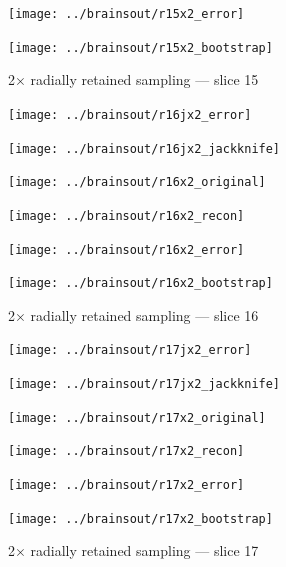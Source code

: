 \documentclass[article]{jdssv}
\begin{document}
\begin{appendix}
\begin{figure}
\begin{centering}
\parbox{\imsize}{\texttt{[image: ../brainsout/r15x2\_error]}}
\parbox{\imsize}{\texttt{[image: ../brainsout/r15x2\_bootstrap]}}

\end{centering}
\caption{2$\times$ radially retained sampling --- slice 15}
\end{figure}


\begin{figure}
\begin{centering}

\parbox{\imsize}{\texttt{[image: ../brainsout/r16jx2\_error]}}
\parbox{\imsize}{\texttt{[image: ../brainsout/r16jx2\_jackknife]}}

\vspace{\vertsep}

\parbox{\imsize}{\texttt{[image: ../brainsout/r16x2\_original]}}
\parbox{\imsize}{\texttt{[image: ../brainsout/r16x2\_recon]}}

\vspace{\vertsep}

\parbox{\imsize}{\texttt{[image: ../brainsout/r16x2\_error]}}
\parbox{\imsize}{\texttt{[image: ../brainsout/r16x2\_bootstrap]}}

\end{centering}
\caption{2$\times$ radially retained sampling --- slice 16}
\end{figure}


\begin{figure}
\begin{centering}

\parbox{\imsize}{\texttt{[image: ../brainsout/r17jx2\_error]}}
\parbox{\imsize}{\texttt{[image: ../brainsout/r17jx2\_jackknife]}}

\vspace{\vertsep}

\parbox{\imsize}{\texttt{[image: ../brainsout/r17x2\_original]}}
\parbox{\imsize}{\texttt{[image: ../brainsout/r17x2\_recon]}}

\vspace{\vertsep}

\parbox{\imsize}{\texttt{[image: ../brainsout/r17x2\_error]}}
\parbox{\imsize}{\texttt{[image: ../brainsout/r17x2\_bootstrap]}}

\end{centering}
\caption{2$\times$ radially retained sampling --- slice 17}
\end{figure}


\begin{figure}
\begin{centering}


\end{centering}
\end{figure}
\end{appendix}
\end{document}
